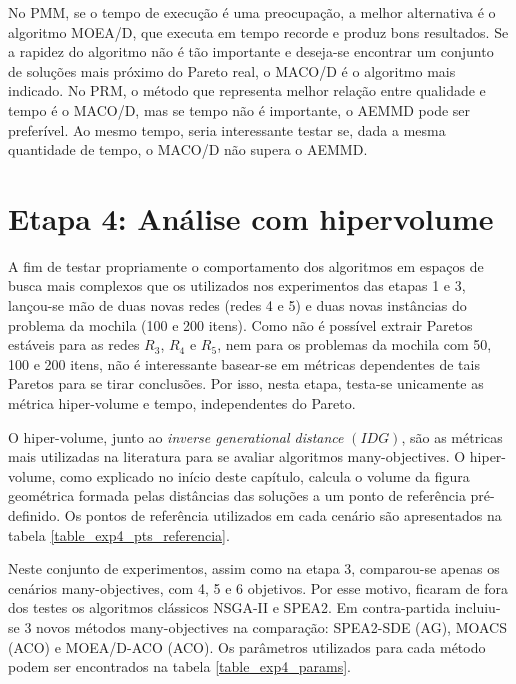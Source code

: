 No PMM, se o tempo de execução é uma preocupação, a melhor alternativa é o algoritmo MOEA/D, que executa em tempo recorde e produz bons resultados. Se a rapidez do algoritmo não é tão importante e deseja-se encontrar um conjunto de soluções mais próximo do Pareto real, o MACO/D é o algoritmo mais indicado. No PRM, o método que representa melhor relação entre qualidade e tempo é o MACO/D, mas se tempo não é importante, o AEMMD pode ser preferível. Ao mesmo tempo, seria interessante testar se, dada a mesma quantidade de tempo, o MACO/D não supera o AEMMD.

\section{Etapa 4: Análise com hipervolume}
\label{section_experimentos_etapa4}

A fim de testar propriamente o comportamento dos algoritmos em espaços de busca mais complexos que os utilizados nos experimentos das etapas 1 e 3, lançou-se mão de duas novas redes (redes 4 e 5) e duas novas instâncias do problema da mochila (100 e 200 itens). Como não é possível extrair Paretos estáveis para as redes $R_3$, $R_4$ e $R_5$, nem para os problemas da mochila com 50, 100 e 200 itens, não é interessante basear-se em métricas dependentes de tais Paretos para se tirar conclusões. Por isso, nesta etapa, testa-se unicamente as métrica hiper-volume e tempo, independentes do Pareto.

O hiper-volume, junto ao \textit{inverse generational distance} $(IDG)$, são as métricas mais utilizadas na literatura para se avaliar algoritmos many-objectives. O hiper-volume, como explicado no início deste capítulo, calcula o volume da figura geométrica formada pelas distâncias das soluções a um ponto de referência pré-definido. Os pontos de referência utilizados em cada cenário são apresentados na tabela \ref{table_exp4_pts_referencia}.

Neste conjunto de experimentos, assim como na etapa 3, comparou-se apenas os cenários many-objectives, com 4, 5 e 6 objetivos. Por esse motivo, ficaram de fora dos testes os algoritmos clássicos NSGA-II e SPEA2. Em contra-partida incluiu-se 3 novos métodos many-objectives na comparação: SPEA2-SDE (AG), MOACS (ACO) e MOEA/D-ACO (ACO). Os parâmetros utilizados para cada método podem ser encontrados na tabela \ref{table_exp4_params}.

